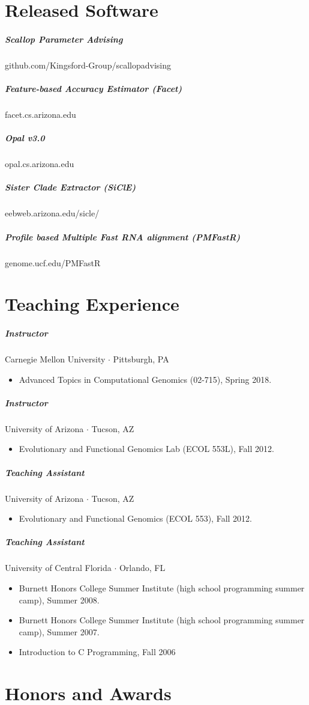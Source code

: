 \documentclass[10pt,letterpaper]{article}
\newcommand{\bigdot}{$\cdot$\xspace}
\begin{document}
\section*{Released Software}
\subparagraph{Scallop Parameter Advising}						github.com/Kingsford-Group/scallopadvising
\subparagraph{Feature-based Accuracy Estimator (Facet)} 			facet.cs.arizona.edu
\subparagraph{Opal v3.0}										opal.cs.arizona.edu 
\subparagraph{Sister Clade Extractor (SiClE)}						eebweb.arizona.edu/sicle/
\subparagraph{Profile based Multiple Fast RNA alignment (PMFastR)}	genome.ucf.edu/PMFastR 

\section*{Teaching Experience}

\subparagraph{Instructor}  Carnegie Mellon University \bigdot Pittsburgh, PA
\begin{itemize}
    \item Advanced Topics in Computational Genomics (02-715), Spring 2018.
\end{itemize}

\subparagraph{Instructor} University of Arizona \bigdot Tucson, AZ
\begin{itemize}
    \item Evolutionary and Functional Genomics Lab (ECOL 553L), Fall 2012.
\end{itemize}

\subparagraph{Teaching Assistant}
University of Arizona \bigdot Tucson, AZ
\begin{itemize}
    \item Evolutionary and Functional Genomics (ECOL 553), Fall 2012.
\end{itemize}

\subparagraph{Teaching Assistant}
University of Central Florida \bigdot Orlando, FL
\begin{itemize}
    \item Burnett Honors College Summer Institute (high school programming summer camp), Summer 2008.
    \item Burnett Honors College Summer Institute (high school programming summer camp), Summer 2007.
    \item Introduction to C Programming, Fall 2006
\end{itemize}

\section*{Honors and Awards}
\end{document}
